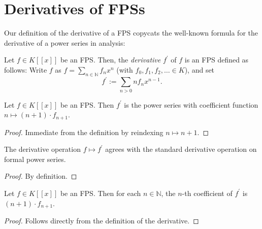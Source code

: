 \section{Derivatives of FPSs}

Our definition of the derivative of a FPS copycats the well-known formula for
the derivative of a power series in analysis:

\begin{definition}
\label{def.fps.deriv}
\leantarget
\leanok
Let $f\in K\left[  \left[  x\right]  \right]  $ be an
FPS. Then, the \emph{derivative} $f^{\prime}$ of $f$ is an FPS defined as
follows: Write $f$ as $f=\sum_{n\in\mathbb{N}}f_{n}x^{n}$ (with $f_{0}%
,f_{1},f_{2},\ldots\in K$), and set%
\[
f^{\prime}:=\sum_{n>0}nf_{n}x^{n-1}.
\]
\end{definition}

\begin{lemma}
\label{lem.fps.deriv.mk}
\leanhelper
\leanok
Let $f\in K\left[  \left[  x\right]  \right]  $ be an FPS.
Then $f^{\prime}$ is the power series with coefficient function
$n \mapsto (n+1) \cdot f_{n+1}$.
\end{lemma}

\begin{proof}
\leanok
Immediate from the definition by reindexing $n \mapsto n+1$.
\end{proof}

\begin{lemma}
\label{lem.fps.deriv.eq-derivativeFun}
\leanhelper
\leanok
The derivative operation $f \mapsto f^{\prime}$ agrees with
the standard derivative operation on formal power series.
\end{lemma}

\begin{proof}
\leanok
By definition.
\end{proof}

\begin{lemma}
\label{lem.fps.deriv.coeff-formula}
\leanhelper
\leanok
Let $f\in K\left[  \left[  x\right]  \right]  $ be an FPS.
Then for each $n\in\mathbb{N}$, the $n$-th coefficient of $f^{\prime}$
is $(n+1) \cdot f_{n+1}$.
\end{lemma}

\begin{proof}
\leanok
Follows directly from the definition of the derivative.
\end{proof}

